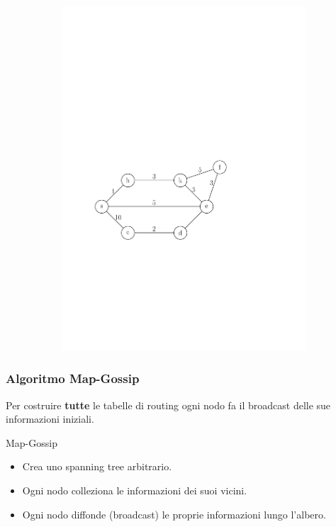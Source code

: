 \documentclass[10pt,xcolor=dvipsnames]{beamer}
\begin{document}
\begin{frame}
\begin{figure}[h]
\begin{subfigure}[b]{0.6\textwidth}
		\hspace*{22pt}\includegraphics[width=.85\linewidth]{routing_table_graph.pdf}
		\end{subfigure}
	\end{figure}
\end{frame}

\begin{frame}
	\frametitle{Algoritmo Map-Gossip}
	Per costruire \textbf{tutte} le tabelle di routing
	ogni nodo fa il broadcast delle sue informazioni iniziali.

	\vfill
	\begin{block}
		{Map-Gossip}
		\begin{itemize}
			\item Crea uno spanning tree arbitrario.
			\item Ogni nodo colleziona le informazioni dei suoi vicini.
			\item Ogni nodo diffonde (broadcast) le proprie informazioni lungo l'albero.
		\end{itemize}
	\end{block}
\end{frame}
\end{document}
